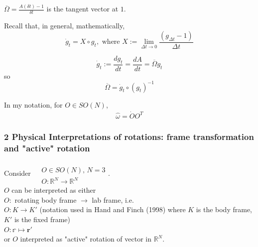 \documentclass[10pt]{amsart}
\begin{document}
\begin{multicols*}{2}
$\overline{\Omega} = \frac{ A(\delta t) - 1}{ \delta t}$ is the tangent vector at $1$. 

Recall that, in general, mathematically, 
\[
\dot{g}_t = X \circ g_t, \text{ where } X := \lim_{\Delta t \to 0} \frac{(g_{\Delta t} - 1 ) }{ \Delta t}
\]

\begin{equation}\label{Eq:TangentVectorAsRightInvariantForm}
\dot{g}_t := \frac{dg_t}{dt} = \frac{dA}{dt} = \overline{\Omega} g_t
\end{equation}
so 
\begin{equation}
\overline{\Omega} = \dot{g}_t \circ (g_t)^{-1}
\end{equation}

In my notation, for $O \in SO(N)$,
\begin{equation}
	\begin{gathered}
		\widehat{\omega} = \dot{O} O^T		
	\end{gathered}
\end{equation}

\subsubsection{2 Physical Interpretations of rotations: frame transformation and "active" rotation}

Consider $\begin{aligned} & \quad \\ 
	& O\in SO(N), \, N =3 \\
	& O:\mathbb{R}^N \to \mathbb{R}^N \end{aligned}$. \\ 

$O$ can be interpreted as either \\
$O:$ rotating body frame $\to$ lab frame, i.e. \\
$O: K \to K'$ (notation used in Hand and Finch (1998) \cite{HaFi1998} where $K$ is the body frame, $K'$ is the fixed frame) \\ 
$O:\mathbb{r} \mapsto \mathbf{r}'$ \\

or $O$ interpreted as "active" rotation of vector in $\mathbb{R}^N$. \\


\end{multicols*}
\end{document}
